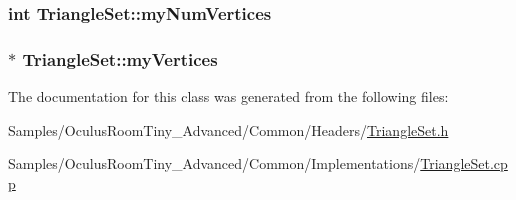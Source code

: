 \subsubsection[{\texorpdfstring{my\+Num\+Vertices}{myNumVertices}}]{\setlength{\rightskip}{0pt plus 5cm}int Triangle\+Set\+::my\+Num\+Vertices\hspace{0.3cm}{\ttfamily [protected]}}\hypertarget{class_triangle_set_aaa4eb472d41e4d1a3c0e4ef7524cacfa}{}\label{class_triangle_set_aaa4eb472d41e4d1a3c0e4ef7524cacfa}
\subsubsection[{\texorpdfstring{my\+Vertices}{myVertices}}]{$\ast$ Triangle\+Set\+::my\+Vertices\hspace{0.3cm}{\ttfamily [protected]}}\hypertarget{class_triangle_set_ae05f53594858e811f4aa0d866b9e9665}{}\label{class_triangle_set_ae05f53594858e811f4aa0d866b9e9665}


The documentation for this class was generated from the following files\+:\begin{DoxyCompactItemize}
\item 
Samples/\+Oculus\+Room\+Tiny\+\_\+\+Advanced/\+Common/\+Headers/\hyperlink{_triangle_set_8h}{Triangle\+Set.\+h}\item 
Samples/\+Oculus\+Room\+Tiny\+\_\+\+Advanced/\+Common/\+Implementations/\hyperlink{_triangle_set_8cpp}{Triangle\+Set.\+cpp}\end{DoxyCompactItemize}

